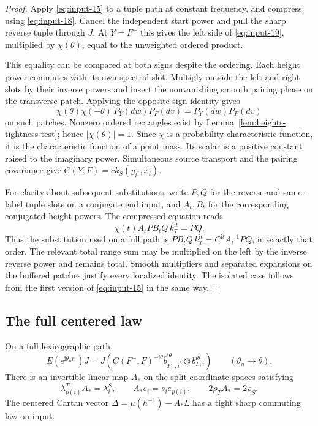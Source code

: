\begin{proof}
Apply \eqref{eq:input-15} to a tuple path at constant frequency, and compress
using \eqref{eq:input-18}.  Cancel the independent start power and pull the
sharp reverse tuple through $J$.  At $Y=F^-$ this gives the left side of
\eqref{eq:input-19}, multiplied by $\chi(\theta)$, equal to the unweighted
ordered product.

This equality can be compared at both signs despite the ordering.  Each
height power commutes with its own spectral slot.  Multiply outside the
left and right slots by their inverse powers and insert the nonvanishing
smooth pairing phase on the transverse patch.  Applying the opposite-sign
identity gives
\[
 \chi(\theta)\chi(-\theta)\,P_Y(dw)P_F(dv)
 =P_Y(dw)P_F(dv)
\]
on such patches.  Nonzero ordered rectangles exist by
Lemma~\ref{lem:heights-tightness-test}; hence $|\chi(\theta)|=1$.
Since $\chi$ is a probability characteristic function, it is the
characteristic function of a point mass.  Its scalar is a positive
constant raised to the imaginary power.  Simultaneous source transport and
the pairing covariance give $C(Y,F)=c k_S(y_{i^*},x_i)$.

For clarity about subsequent substitutions, write $P,Q$ for the reverse
and same-label tuple slots on a conjugate end input, and $A_t,B_t$ for the
corresponding conjugated height powers.  The compressed equation reads
\[
 \chi(t)A_t P B_t Q\,k_T^{\mathrm it}=PQ.
\]
Thus the substitution used on a full path is
$P B_tQ\,k_T^{\mathrm it}=C^{\mathrm it}A_t^{-1}PQ$, in exactly that
order.  The relevant total range sum may be multiplied on the left by
the inverse reverse power and remains total.  Smooth multipliers and
separated expansions on the buffered patches justify every localized
identity.  The isolated case follows from the first version of
\eqref{eq:input-15} in the same way.
\end{proof}

\subsection{The full centered law}

\begin{proposition}\label{prop:heights-full-law}
On a full lexicographic path,
\begin{equation}\label{eq:input-20}
 E(e^{\mathrm i\theta_n r_i})J
 =J\!\left(C(F^-,F)^{-\mathrm i\theta}
   \bar b_{F^-,i^*}^{\mathrm i\theta}\otimes b_{F,i}^{\mathrm i\theta}\right)
 \qquad(\theta_n\to\theta).
\end{equation}
There is an invertible linear map $A_*$ on the split-coordinate spaces
satisfying
\begin{equation}\label{eq:heights-weight-map}
 \lambda_{p(i)}^T A_*=\lambda_i^S,\qquad
 A_*e_i=s_i e_{p(i)},\qquad 2\rho_TA_*=2\rho_S.
\end{equation}
The centered Cartan vector $\Delta=\mu(h^{-1})-A_*L$ has a tight sharp
commuting law on input.
\end{proposition}

